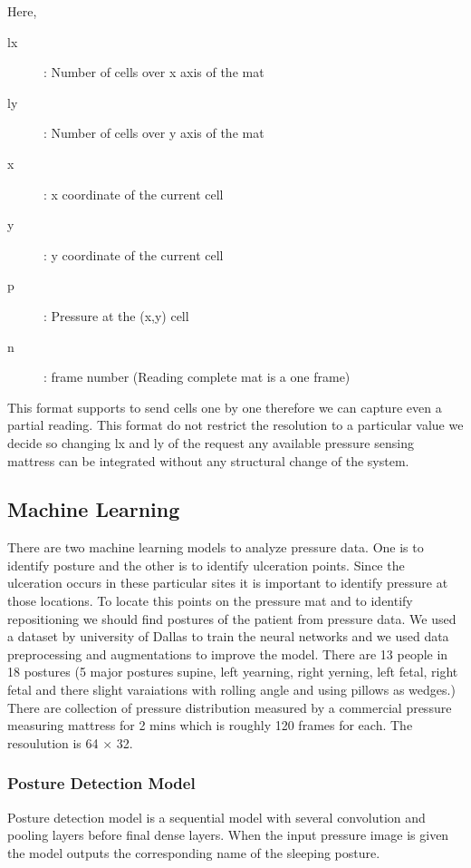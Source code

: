 Here,

\begin{description}
	\item[lx]: Number of cells over x axis of the mat 
	\item[ly]: Number of cells over y axis of the mat 
	\item[x]: x coordinate of the current cell 
	\item[y]: y coordinate of the current cell  
	\item[p]: Pressure at the (x,y) cell
	\item[n]: frame number (Reading complete mat is a one frame)  
\end{description}

This format supports to send cells one by one therefore we can capture even a partial reading. This format do not restrict the resolution to a particular value we decide so changing lx and ly of the request any available pressure sensing mattress can be integrated without any structural change of the system. 

\subsection{Machine Learning}

There are two machine learning models to analyze pressure data. One is to identify posture and the other is to identify ulceration points. Since the ulceration occurs in these particular sites it is important to identify pressure at those locations. To locate this points on the pressure mat and to identify repositioning we should find postures of the patient from pressure data. 
We used a dataset by university of Dallas to train the neural networks and we used data preprocessing and augmentations to improve the model. There are 13 people in 18 postures (5 major postures supine, left yearning, right yerning, left fetal, right fetal and there slight varaiations with rolling angle and using pillows as wedges.) There are collection of pressure distribution measured by a commercial pressure measuring mattress for 2 mins which is roughly 120 frames for each. The resoulution is 64 $\times$ 32.

\subsubsection{Posture Detection Model}

Posture detection model is a sequential model with several convolution and pooling layers before final dense layers. When the input pressure image is given the model outputs the corresponding name of the sleeping posture.



